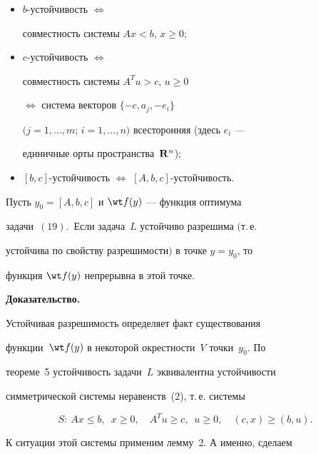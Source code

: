 \begin{itemize}


\item[1.] $b$-устойчивость $\Leftrightarrow$


совместность системы $Ax<b$, $x\geq 0$;


\item[2.] $c$-устойчивость $\Leftrightarrow$


совместность системы $A^Tu>c$, $u\geq 0$


$\Leftrightarrow$ система векторов $\{-c,a_j,-e_i\}$


$(j=1,\dotsc,m$; $i=1,\dotsc,n)$ всесторонняя (здесь $e_i$ ---


единичные орты пространства~$\bold R^n$);


\item[3.] $[b,c]$-устойчивость $\Leftrightarrow$ $[A,b,c]$-устойчивость.


\end{itemize}





\begin{thm}


Пусть $y_0=[A,b,c]$ и $\wt f(y)$ --- функция оптимума


задачи~$(19)$.\ Если задача~$L$ устойчиво разрешима $($т.\,е.


устойчива по свойству разрешимости$)$ в точке $y=y_0$, то


функция $\wt f(y)$ непрерывна в этой точке.


\end{thm}





{\bf Доказательство.}


Устойчивая разрешимость определяет факт существования


функции~$\wt f(y)$ в некоторой окрестности~$V$ точки~$y_0$. По


теореме~5 устойчивость задачи~$L$ эквивалентна устойчивости


симметрической системы неравенств~(2), т.\,е. системы


$$


S:\ Ax\leq b,\ \; x\geq 0,\quad A^Tu\geq c,\ \; u\geq 0,\quad


(c,x)\geq (b,u).


$$


К ситуации этой системы применим лемму~2. А именно, сделаем


